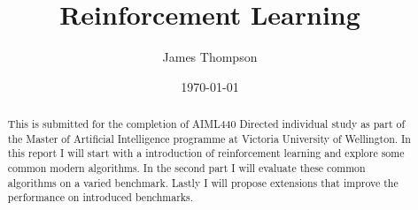 \documentclass[11pt
              , a4paper
              , twoside
              , openright
              ]{report}
\title{Reinforcement Learning}
\author{James Thompson}
\date{\today}
\begin{document}
\frontmatter



\begin{abstract}

This is submitted for the completion of AIML440 Directed individual study as part of the Master of Artificial Intelligence programme at Victoria University of Wellington. In this report I will start with a introduction of reinforcement learning and explore some common modern algorithms. In the second part I will evaluate these common algorithms on a varied benchmark. Lastly I will propose extensions that improve the performance on introduced benchmarks.

\end{abstract}


\maketitle

% 

\tableofcontents



\mainmatter








\backmatter



%


\end{document}
